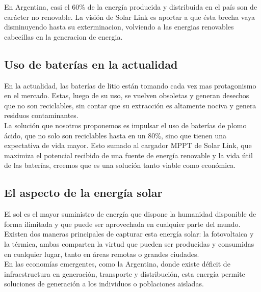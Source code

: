 En Argentina, casi el 60\% de la energía producida y distribuida en el país son de carácter no renovable. La visión de Solar Link es aportar a que ésta brecha vaya disminuyendo hasta su exterminacion, volviendo a las energias renovables cabecillas en la generacion de energia. \\

\subsection{Uso de baterías en la actualidad}
En la actualidad, las baterías de litio están tomando cada vez mas protagonismo en el mercado. Estas, luego de su uso, se vuelven obsoletas y generan desechos que no son reciclables, sin contar que su extracción es altamente nociva y genera residuos contaminantes. \\

La solución que nosotros proponemos es impulsar el uso de baterías de plomo ácido, que no solo son reciclables hasta en un 80\%, sino que tienen una expectativa de vida mayor. Esto sumado al cargador MPPT de Solar Link, que maximiza el potencial recibido de una fuente de energía renovable y la vida útil de las baterías, creemos que es una solución tanto viable como económica. \\

\subsection{El aspecto de la energía solar}
El sol es el mayor suministro de energía que dispone la humanidad disponible de forma ilimitada
y que puede ser aprovechada en cualquier parte del mundo. Existen dos maneras principales de capturar esta energía solar: la fotovoltaica y la térmica, ambas comparten la virtud que pueden ser producidas y consumidas en cualquier lugar, tanto en áreas remotas o grandes ciudades.\\

En las economías emergentes, como la Argentina, donde existe déficit de infraestructura en
generación, transporte y distribución, esta energía permite soluciones de generación a los
individuos o poblaciones aisladas.

